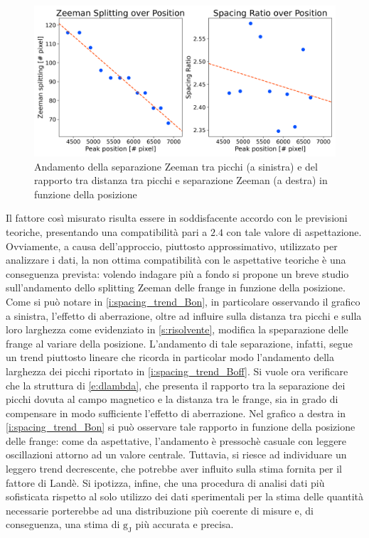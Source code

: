 \documentclass[twocolumn,10pt]{asme2ej}
\begin{document}
\begin{figure}
    \centering
    \includegraphics[width=\linewidth]{../Plots/Bon_zeeman_trend.png}
    \caption{Andamento della separazione Zeeman tra picchi (a sinistra) e del rapporto tra distanza tra picchi e separazione Zeeman (a destra) in funzione della posizione}
    \label{i:spacing_trend_Bon}
    \vspace{-20pt}
\end{figure}

\vspace{-5pt}
Il fattore così misurato risulta essere in soddisfacente accordo con le previsioni teoriche, presentando una
compatibilità pari a $2.4$ con tale valore di aspettazione. Ovviamente, a causa dell'approccio, piuttosto
approssimativo, utilizzato per analizzare i dati, la non ottima compatibilità con le aspettative teoriche è una
conseguenza prevista: volendo indagare più a fondo si propone un breve studio sull'andamento dello splitting Zeeman
delle frange in funzione della posizione. Come si può notare in \autoref{i:spacing_trend_Bon}, in particolare osservando
il grafico a sinistra, l'effetto di aberrazione, oltre ad influire sulla distanza tra picchi e sulla loro larghezza come
evidenziato in \autoref{s:risolvente}, modifica la speparazione delle frange al variare della posizione. L'andamento di
tale separazione, infatti, segue un trend piuttosto lineare che ricorda in particolar modo l'andamento della larghezza
dei picchi riportato in \autoref{i:spacing_trend_Boff}. Si vuole ora verificare che la struttura di \autoref{e:dlambda},
che presenta il rapporto tra la separazione dei picchi dovuta al campo magnetico e la distanza tra le frange, sia in
grado di compensare in modo sufficiente l'effetto di aberrazione. Nel grafico a destra in \autoref{i:spacing_trend_Bon}
si può osservare tale rapporto in funzione della posizione delle frange: come da aspettative, l'andamento è pressochè
casuale con leggere oscillazioni attorno ad un valore centrale. Tuttavia, si riesce ad individuare un leggero trend
decrescente, che potrebbe aver influito sulla stima fornita per il fattore di Landè. Si ipotizza, infine, che una
procedura di analisi dati più sofisticata rispetto al solo utilizzo dei dati sperimentali per la stima delle quantità
necessarie porterebbe ad una distribuzione più coerente di misure e, di conseguenza, una stima di $ \text{g}_{\text{J}}$
più accurata e precisa.
\end{document}
